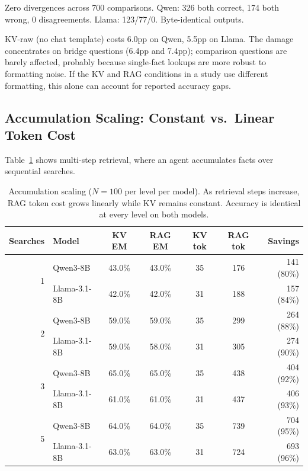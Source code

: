 \documentclass{article}
\begin{document}
Zero divergences across 700 comparisons. Qwen: 326 both correct, 174 both wrong, 0 disagreements. Llama: 123/77/0. Byte-identical outputs.

KV-raw (no chat template) costs 6.0pp on Qwen, 5.5pp on Llama. The damage concentrates on bridge questions (6.4pp and 7.4pp); comparison questions are barely affected, probably because single-fact lookups are more robust to formatting noise. If the KV and RAG conditions in a study use different formatting, this alone can account for reported accuracy gaps.

\subsection{Accumulation Scaling: Constant vs.\ Linear Token Cost}
\label{sec:accumulation}

Table~\ref{tab:accumulation} shows multi-step retrieval, where an agent accumulates facts over sequential searches.

\begin{table}[t]
\centering
\caption{Accumulation scaling ($N{=}100$ per level per model). As retrieval steps increase, RAG token cost grows linearly while KV remains constant. Accuracy is identical at every level on both models.}
\label{tab:accumulation}
\begin{tabular}{rlccccr}
\toprule
\textbf{Searches} & \textbf{Model} & \textbf{KV EM} & \textbf{RAG EM} & \textbf{KV tok} & \textbf{RAG tok} & \textbf{Savings} \\
\midrule
\multirow{2}{*}{1} & Qwen3-8B & 43.0\% & 43.0\% & 35 & 176 & 141 (80\%) \\
& Llama-3.1-8B & 42.0\% & 42.0\% & 31 & 188 & 157 (84\%) \\
\midrule
\multirow{2}{*}{2} & Qwen3-8B & 59.0\% & 59.0\% & 35 & 299 & 264 (88\%) \\
& Llama-3.1-8B & 59.0\% & 58.0\% & 31 & 305 & 274 (90\%) \\
\midrule
\multirow{2}{*}{3} & Qwen3-8B & 65.0\% & 65.0\% & 35 & 438 & 404 (92\%) \\
& Llama-3.1-8B & 61.0\% & 61.0\% & 31 & 437 & 406 (93\%) \\
\midrule
\multirow{2}{*}{5} & Qwen3-8B & 64.0\% & 64.0\% & 35 & 739 & 704 (95\%) \\
& Llama-3.1-8B & 63.0\% & 63.0\% & 31 & 724 & 693 (96\%) \\
\bottomrule
\end{tabular}
\end{table}
\end{document}
